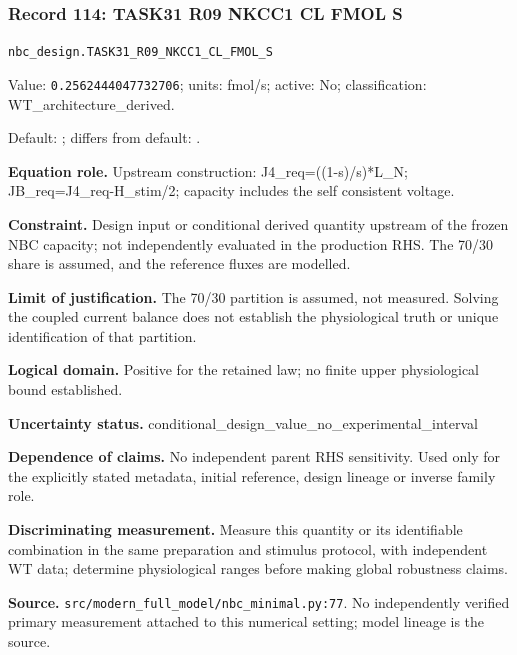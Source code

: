 \subsubsection*{Record 114: TASK31 R09 NKCC1 CL FMOL S}
{\small \nolinkurl{nbc_design.TASK31_R09_NKCC1_CL_FMOL_S}\par

Value: \texttt{0.2562444047732706}; units: fmol/s; active: No; classification: WT\_architecture\_derived.\par

Default: ; differs from default: .\par

\textbf{Equation role.} Upstream construction: J4\_req=((1-s)/s)*L\_N; JB\_req=J4\_req-H\_stim/2; capacity includes the self consistent voltage.\par

\textbf{Constraint.} Design input or conditional derived quantity upstream of the frozen NBC capacity; not independently evaluated in the production RHS. The 70/30 share is assumed, and the reference fluxes are modelled.\par

\textbf{Limit of justification.} The 70/30 partition is assumed, not measured. Solving the coupled current balance does not establish the physiological truth or unique identification of that partition.\par

\textbf{Logical domain.} Positive for the retained law; no finite upper physiological bound established.\par

\textbf{Uncertainty status.} conditional\_design\_value\_no\_experimental\_interval\par

\textbf{Dependence of claims.} No independent parent RHS sensitivity. Used only for the explicitly stated metadata, initial reference, design lineage or inverse family role.\par

\textbf{Discriminating measurement.} Measure this quantity or its identifiable combination in the same preparation and stimulus protocol, with independent WT data; determine physiological ranges before making global robustness claims.\par

\textbf{Source.} \nolinkurl{src/modern_full_model/nbc_minimal.py:77}. No independently verified primary measurement attached to this numerical setting; model lineage is the source.\par}

